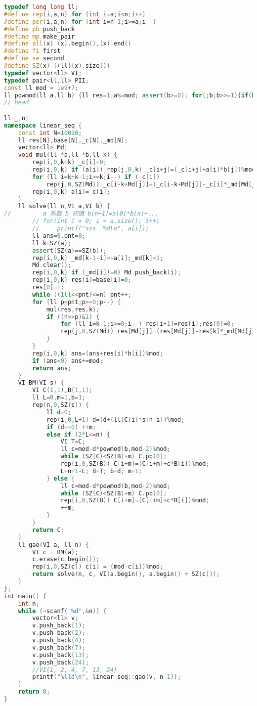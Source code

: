 \begin{lstlisting}[language=C++]
typedef long long ll;
#define rep(i,a,n) for (int i=a;i<n;i++)
#define per(i,a,n) for (int i=n-1;i>=a;i--)
#define pb push_back
#define mp make_pair
#define all(x) (x).begin(),(x).end()
#define fi first
#define se second
#define SZ(x) ((ll)(x).size())
typedef vector<ll> VI;
typedef pair<ll,ll> PII;
const ll mod = 1e9+7;
ll powmod(ll a,ll b) {ll res=1;a%=mod; assert(b>=0); for(;b;b>>=1){if(b&1)res=res*a%mod;a=a*a%mod;}return res;}
// head

ll _,n;
namespace linear_seq {
    const int N=10010;
    ll res[N],base[N],_c[N],_md[N];
    vector<ll> Md;
    void mul(ll *a,ll *b,ll k) {
        rep(i,0,k+k) _c[i]=0;
        rep(i,0,k) if (a[i]) rep(j,0,k) _c[i+j]=(_c[i+j]+a[i]*b[j])%mod;
        for (ll i=k+k-1;i>=k;i--) if (_c[i])
            rep(j,0,SZ(Md)) _c[i-k+Md[j]]=(_c[i-k+Md[j]]-_c[i]*_md[Md[j]])%mod;
        rep(i,0,k) a[i]=_c[i];
    }
    ll solve(ll n,VI a,VI b) {
//         a 系数 b 初值 b[n+1]=a[0]*b[n]+...
        // for(int i = 0; i < a.size(); i++)
        //     printf("sss  %d\n", a[i]);
        ll ans=0,pnt=0;
        ll k=SZ(a);
        assert(SZ(a)==SZ(b));
        rep(i,0,k) _md[k-1-i]=-a[i];_md[k]=1;
        Md.clear();
        rep(i,0,k) if (_md[i]!=0) Md.push_back(i);
        rep(i,0,k) res[i]=base[i]=0;
        res[0]=1;
        while ((1ll<<pnt)<=n) pnt++;
        for (ll p=pnt;p>=0;p--) {
            mul(res,res,k);
            if ((n>>p)&1) {
                for (ll i=k-1;i>=0;i--) res[i+1]=res[i];res[0]=0;
                rep(j,0,SZ(Md)) res[Md[j]]=(res[Md[j]]-res[k]*_md[Md[j]])%mod;
            }
        }
        rep(i,0,k) ans=(ans+res[i]*b[i])%mod;
        if (ans<0) ans+=mod;
        return ans;
    }
    VI BM(VI s) {
        VI C(1,1),B(1,1);
        ll L=0,m=1,b=1;
        rep(n,0,SZ(s)) {
            ll d=0;
            rep(i,0,L+1) d=(d+(ll)C[i]*s[n-i])%mod;
            if (d==0) ++m;
            else if (2*L<=n) {
                VI T=C;
                ll c=mod-d*powmod(b,mod-2)%mod;
                while (SZ(C)<SZ(B)+m) C.pb(0);
                rep(i,0,SZ(B)) C[i+m]=(C[i+m]+c*B[i])%mod;
                L=n+1-L; B=T; b=d; m=1;
            } else {
                ll c=mod-d*powmod(b,mod-2)%mod;
                while (SZ(C)<SZ(B)+m) C.pb(0);
                rep(i,0,SZ(B)) C[i+m]=(C[i+m]+c*B[i])%mod;
                ++m;
            }
        }
        return C;
    }
    ll gao(VI a, ll n) {
        VI c = BM(a);
        c.erase(c.begin());
        rep(i,0,SZ(c)) c[i] = (mod-c[i])%mod;
        return solve(n, c, VI(a.begin(), a.begin() + SZ(c)));
    }
};
int main() {
    int n;
    while (~scanf("%d",&n)) {
        vector<ll> v;
        v.push_back(1);
        v.push_back(2);
        v.push_back(4);
        v.push_back(7);
        v.push_back(13);
        v.push_back(24);
        //VI{1, 2, 4, 7, 13, 24}
        printf("%lld\n", linear_seq::gao(v, n-1));
    }
    return 0;
}
\end{lstlisting}

